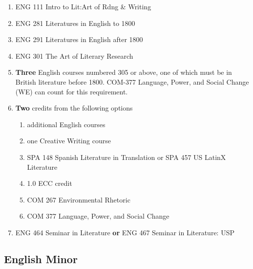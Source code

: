\documentclass[
  letterpaper,
]{scrbook}
\providecommand{\tightlist}{%
  \setlength{\itemsep}{0pt}\setlength{\parskip}{0pt}}
\begin{document}
\begin{enumerate}
\def\labelenumi{\arabic{enumi}.}
\tightlist
\item
  ENG 111 Intro to Lit:Art of Rdng \& Writing\\
\item
  ENG 281 Literatures in English to 1800\\
\item
  ENG 291 Literatures in English after 1800\\
\item
  ENG 301 The Art of Literary Research\\
\item
  \textbf{Three} English courses numbered 305 or above, one of which
  must be in British literature before 1800. COM-377 Language, Power,
  and Social Change (WE) can count for this requirement.\\
\item
  \textbf{Two} credits from the following options

  \begin{enumerate}
  \def\labelenumii{\alph{enumii}.}
  \tightlist
  \item
    additional English courses\\
  \item
    one Creative Writing course\\
  \item
    SPA 148 Spanish Literature in Translation or SPA 457 US LatinX
    Literature\\
  \item
    1.0 ECC credit\\
  \item
    COM 267 Environmental Rhetoric\\
  \item
    COM 377 Language, Power, and Social Change\\
  \end{enumerate}
\item
  ENG 464 Seminar in Literature \textbf{or} ENG 467 Seminar in
  Literature: USP
\end{enumerate}

\subsection{English Minor}\label{english-minor}
\end{document}
